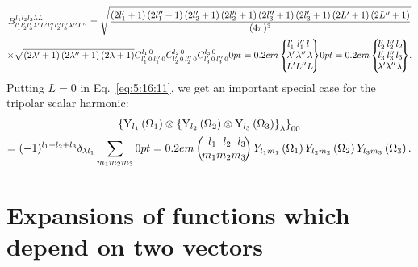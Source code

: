 \begin{gather}
B_{l_{1}^{\prime} l_{2}^{\prime} l_{3}^{\prime} \lambda^{\prime} L^{\prime} l_{1}^{\prime \prime} l_{2}^{\prime \prime} l_{3}^{\prime \prime} \lambda^{\prime \prime} L^{\prime \prime}}^{l_{1} l_{2} l_{3} \lambda L}=\sqrt{\frac{\left(2 l_{1}^{\prime}+1\right)\left(2 l_{1}^{\prime \prime}+1\right)\left(2 l_{2}^{\prime}+1\right)\left(2 l_{2}^{\prime \prime}+1\right)\left(2 l_{3}^{\prime \prime}+1\right)\left(2 l_{3}^{\prime}+1\right)\left(2 L^{\prime}+1\right)\left(2 L^{\prime \prime}+1\right)}{(4 \pi)^{3}}}  \notag\\
\times \sqrt{\left(2 \lambda^{\prime}+1\right)\left(2 \lambda^{\prime \prime}+1\right)(2 \lambda+1)} \clebsch{l_{1}^{\prime}}{0}{l_{1}^{\prime \prime}}{0}{l_{1}}{0} \clebsch{l_{2}^{\prime}}{0}{l_{2}^{\prime \prime}}{0}{l_{2}}{0} \clebsch{l_{3}^{\prime}}{0}{l_{3}^{\prime \prime}}{0}{l_{3}}{0}
\ninej{l_{1}^{\prime} }{l_{1}^{\prime \prime}}{l_{1}}%
{\lambda^{\prime}}{\lambda^{\prime \prime}}{\lambda}%
{L^{\prime}}{L^{\prime \prime}}{L}
\ninej%
{l_{2}^{\prime}}{l_{2}^{\prime \prime}}{l_{2}}%
{l_{3}^{\prime}}{l_{3}^{\prime \prime}}{l_{3}}%
{\lambda^{\prime}}{\lambda^{\prime \prime}}{\lambda}.
 \label{eq:5:16:18}
\end{gather}
Putting $L=0$ in Eq.~\eqref{eq:5:16:11}, we get an important special case for the tripolar scalar harmonic:
\begin{multline}
\left\{\mathrm{Y}_{l_{1}}\left(\Omega_{1}\right) \otimes\left\{\mathrm{Y}_{l_{2}}\left(\Omega_{2}\right) \otimes \mathrm{Y}_{l_{3}}\left(\Omega_{3}\right)\right\}_{\lambda}\right\}_{00}  \\
=(-1)^{l_{1}+l_{2}+l_{3}} \delta_{\lambda l_{1}} \sum_{m_{1} m_{2} m_{3}}
\threej{l_{1}}{l_{2}}{l_{3}}{m_{1}}{m_{2}} {m_{3}}
 Y_{l_{1} m_{1}}\left(\Omega_{1}\right) Y_{l_{2} m_{2}}\left(\Omega_{2}\right) Y_{l_{3} m_{3}}\left(\Omega_{3}\right). \label{eq:5:16:19}
\end{multline}
\section{Expansions of functions which depend on two vectors}\label{sec:5.17}
